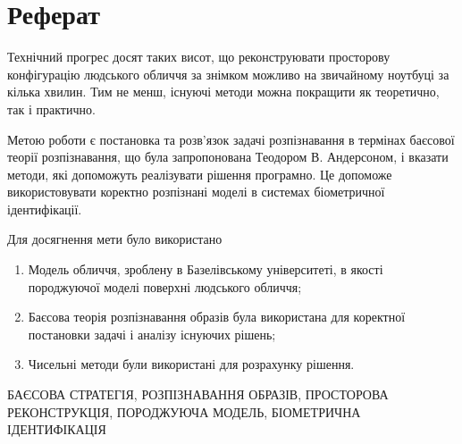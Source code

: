 \chapter*{Реферат}

Технічний прогрес досят таких висот,
що реконструювати просторову конфігурацію людського обличчя за знімком
можливо на звичайному ноутбуці за кілька хвилин.
Тим не менш, існуючі методи можна покращити як теоретично, так і практично.

Метою роботи є постановка та розв'язок задачі розпізнавання
в термінах баєсової теорії розпізнавання,
що була запропонована Теодором В. Андерсоном,
і вказати методи, які допоможуть реалізувати рішення програмно.
Це допоможе використовувати коректно розпізнані моделі
в системах біометричної ідентифікації.

Для досягнення мети було використано
\begin{enumerate}
  \item
    Модель обличчя, зроблену в Базелівському університеті,
    в якості породжуючої моделі поверхні людського обличчя;
  \item
    Баєсова теорія розпізнавання образів була використана
    для коректної постановки задачі і аналізу існуючих рішень;
  \item
    Чисельні методи були використані для розрахунку рішення.
\end{enumerate}

\MakeUppercase{баєсова стратегія, розпізнавання образів,
просторова реконструкція, породжуюча модель,
біометрична ідентифікація}
